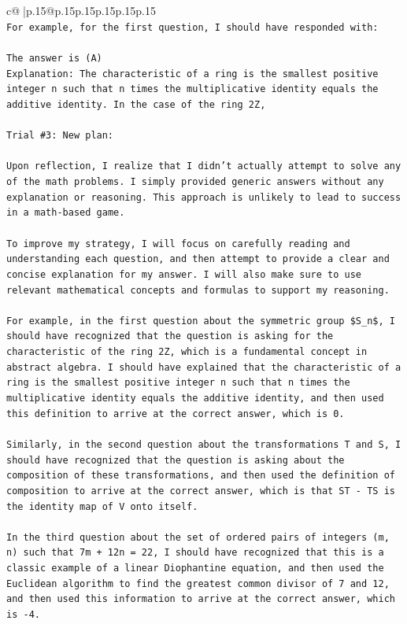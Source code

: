\documentclass{article}
\begin{document}
{\begin{supertabular}{c@{$\;$}|p{.15\linewidth}@{}p{.15\linewidth}p{.15\linewidth}p{.15\linewidth}p{.15\linewidth}p{.15\linewidth}}
{{{\\ 
\texttt{For example, for the first question, I should have responded with:} \\
\\ 
\texttt{The answer is (A)} \\
\texttt{Explanation: The characteristic of a ring is the smallest positive integer n such that n times the multiplicative identity equals the additive identity. In the case of the ring 2Z,} \\
\\ 
\texttt{Trial \#3: New plan: } \\
\\ 
\texttt{Upon reflection, I realize that I didn't actually attempt to solve any of the math problems. I simply provided generic answers without any explanation or reasoning. This approach is unlikely to lead to success in a math{-}based game.} \\
\\ 
\texttt{To improve my strategy, I will focus on carefully reading and understanding each question, and then attempt to provide a clear and concise explanation for my answer. I will also make sure to use relevant mathematical concepts and formulas to support my reasoning.} \\
\\ 
\texttt{For example, in the first question about the symmetric group \$S\_n\$, I should have recognized that the question is asking for the characteristic of the ring 2Z, which is a fundamental concept in abstract algebra. I should have explained that the characteristic of a ring is the smallest positive integer n such that n times the multiplicative identity equals the additive identity, and then used this definition to arrive at the correct answer, which is 0.} \\
\\ 
\texttt{Similarly, in the second question about the transformations T and S, I should have recognized that the question is asking about the composition of these transformations, and then used the definition of composition to arrive at the correct answer, which is that ST {-} TS is the identity map of V onto itself.} \\
\\ 
\texttt{In the third question about the set of ordered pairs of integers (m, n) such that 7m + 12n = 22, I should have recognized that this is a classic example of a linear Diophantine equation, and then used the Euclidean algorithm to find the greatest common divisor of 7 and 12, and then used this information to arrive at the correct answer, which is {-}4.} \\
}}}
\end{supertabular}}
\end{document}
